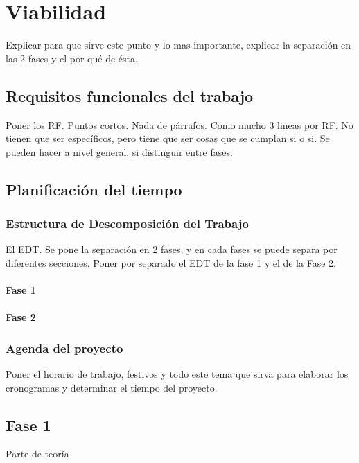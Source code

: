 \chapter{Viabilidad}
{\color{red} Explicar para que sirve este punto y lo mas importante, explicar la separación en las 2 fases y el por qué de ésta.}

\section{Requisitos funcionales del trabajo}
{\color{red} Poner los RF. Puntos cortos. Nada de párrafos. Como mucho 3 lineas por RF. No tienen que ser específicos, pero tiene que ser cosas que se cumplan si o si. Se pueden hacer a nivel general, si distinguir entre fases.}


\section{Planificación del tiempo}

\subsection[EDT]{Estructura de Descomposición del Trabajo}
{\color{red} El EDT. Se pone la separación en 2 fases, y en cada fases se puede separa por diferentes secciones. Poner por separado el EDT de la fase 1 y el de la Fase 2.}

\subsubsection{Fase 1}

\subsubsection{Fase 2}

\subsection{Agenda del proyecto}
{\color{red} Poner el horario de trabajo, festivos y todo este tema que sirva para elaborar los cronogramas y determinar el tiempo del proyecto.}


\section{Fase 1}
{\color{red} Parte de teoría}

